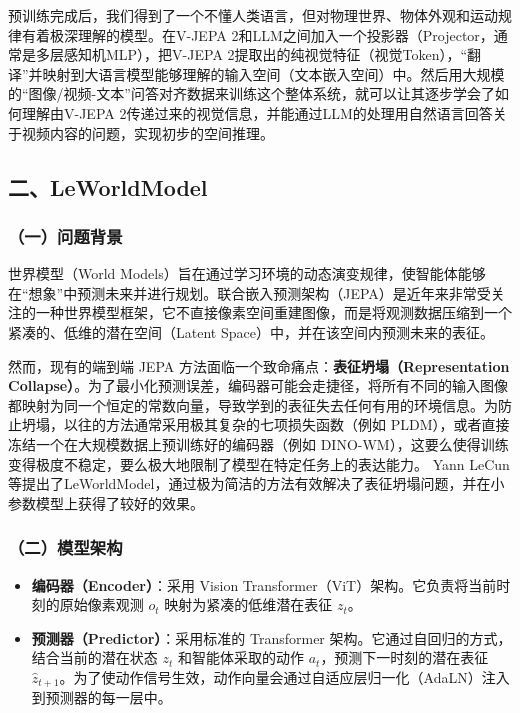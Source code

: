 预训练完成后，我们得到了一个不懂人类语言，但对物理世界、物体外观和运动规律有着极深理解的模型。在V-JEPA 2和LLM之间加入一个投影器（Projector，通常是多层感知机MLP），把V-JEPA 2提取出的纯视觉特征（视觉Token），``翻译''并映射到大语言模型能够理解的输入空间（文本嵌入空间）中。然后用大规模的``图像/视频-文本''问答对齐数据来训练这个整体系统，就可以让其逐步学会了如何理解由V-JEPA 2传递过来的视觉信息，并能通过LLM的处理用自然语言回答关于视频内容的问题，实现初步的空间推理。

\hypertarget{ux4e8cleworldmodel}{%
\subsection{二、LeWorldModel}\label{ux4e8cleworldmodel}}

\hypertarget{ux4e00ux95eeux9898ux80ccux666f-8}{%
\subsubsection{（一）问题背景}\label{ux4e00ux95eeux9898ux80ccux666f-8}}

世界模型（World Models）旨在通过学习环境的动态演变规律，使智能体能够在``想象''中预测未来并进行规划。联合嵌入预测架构（JEPA）是近年来非常受关注的一种世界模型框架，它不直接像素空间重建图像，而是将观测数据压缩到一个紧凑的、低维的潜在空间（Latent Space）中，并在该空间内预测未来的表征。

然而，现有的端到端 JEPA 方法面临一个致命痛点：\textbf{表征坍塌（Representation Collapse）}。为了最小化预测误差，编码器可能会走捷径，将所有不同的输入图像都映射为同一个恒定的常数向量，导致学到的表征失去任何有用的环境信息。为防止坍塌，以往的方法通常采用极其复杂的七项损失函数（例如 PLDM），或者直接冻结一个在大规模数据上预训练好的编码器（例如 DINO-WM），这要么使得训练变得极度不稳定，要么极大地限制了模型在特定任务上的表达能力。
Yann LeCun等提出了LeWorldModel，通过极为简洁的方法有效解决了表征坍塌问题，并在小参数模型上获得了较好的效果。

\hypertarget{ux4e8cux6a21ux578bux67b6ux6784-3}{%
\subsubsection{（二）模型架构}\label{ux4e8cux6a21ux578bux67b6ux6784-3}}

\begin{itemize}
\tightlist
\item
  \textbf{编码器（Encoder）}：采用 Vision Transformer（ViT）架构。它负责将当前时刻的原始像素观测 \(o_t\) 映射为紧凑的低维潜在表征 \(z_t\)。
\item
  \textbf{预测器（Predictor）}：采用标准的 Transformer 架构。它通过自回归的方式，结合当前的潜在状态 \(z_t\) 和智能体采取的动作 \(a_t\)，预测下一时刻的潜在表征 \(\hat{z}_{t+1}\)。为了使动作信号生效，动作向量会通过自适应层归一化（AdaLN）注入到预测器的每一层中。
\end{itemize}

